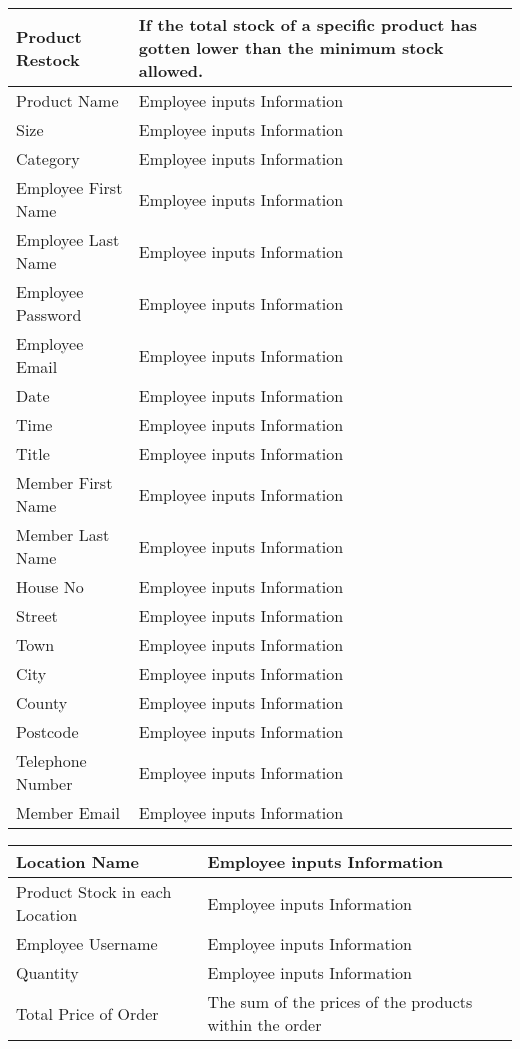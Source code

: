 \begin{python}
	
 \begin{tabular}{|p{4cm}|p{4cm}|}
        \hline
        	{Product Restock} & {If the total stock of a specific product has gotten lower than the minimum stock allowed.}\\ \hline
	{Product Name} & {Employee inputs Information}\\ \hline
	{Size} & {Employee inputs Information}\\ \hline
	{Category} & {Employee inputs Information}\\ \hline
	{Employee First Name} & {Employee inputs Information}\\ \hline
	{Employee Last Name} & {Employee inputs Information}\\ \hline
	{Employee Password} & {Employee inputs Information}\\ \hline
	{Employee Email} & {Employee inputs Information}\\ \hline
	{Date} & {Employee inputs Information}\\ \hline
	{Time} & {Employee inputs Information}\\ \hline
	{Title} & {Employee inputs Information}\\ \hline
	{Member First Name} & {Employee inputs Information}\\ \hline
	{Member Last Name} & {Employee inputs Information}\\ \hline
	{House No} & {Employee inputs Information}\\ \hline
	{Street} & {Employee inputs Information}\\ \hline
	{Town} & {Employee inputs Information}\\ \hline
	{City} & {Employee inputs Information}\\ \hline
	{County} & {Employee inputs Information}\\ \hline
	{Postcode} & {Employee inputs Information}\\ \hline
	{Telephone Number} & {Employee inputs Information}\\ \hline
	{Member Email} & {Employee inputs Information}\\ \hline
	\end{tabular}
	
 \begin{tabular}{|p{4cm}|p{4cm}|}
        \hline	
	{Location Name} & {Employee inputs Information}\\ \hline
	{Product Stock in each Location} & {Employee inputs Information}\\ \hline
	{Employee Username} & {Employee inputs Information}\\ \hline
	{Quantity} & {Employee inputs Information}\\ \hline
	{Total Price of Order} & {The sum of the prices of the products within the order} \\ \hline
   \end{tabular}


\end{python}
